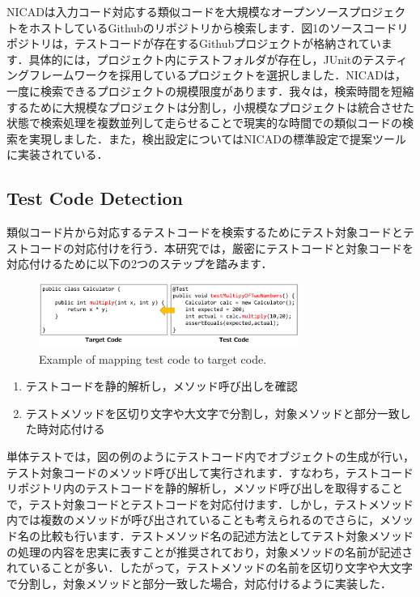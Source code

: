 \documentclass[conference]{IEEEtran}
\begin{document}
NICADは入力コード対応する類似コードを大規模なオープンソースプロジェクトをホストしているGithubのリポジトリから検索します．図1のソースコードリポジトリは，テストコードが存在するGithubプロジェクトが格納されています．具体的には，プロジェクト内にテストフォルダが存在し，JUnitのテスティングフレームワークを採用しているプロジェクトを選択しました．NICADは，一度に検索できるプロジェクトの規模限度があります．我々は，検索時間を短縮するために大規模なプロジェクトは分割し，小規模なプロジェクトは統合させた状態で検索処理を複数並列して走らせることで現実的な時間での類似コードの検索を実現しました．また，検出設定についてはNICADの標準設定で提案ツールに実装されている．

\subsection{Test Code Detection}
類似コード片から対応するテストコードを検索するためにテスト対象コードとテストコードの対応付けを行う．本研究では，厳密にテストコードと対象コードを対応付けるために以下の2つのステップを踏みます．

\begin{figure}[htbp]
\centerline{\includegraphics[width=8.5cm]{mapping.pdf}}
\caption{Example of mapping test code to target code.}
\label{fig}
\end{figure}

\begin{enumerate}
\renewcommand{\labelenumi}{(\arabic{enumi})}
\item テストコードを静的解析し，メソッド呼び出しを確認
\item テストメソッドを区切り文字や大文字で分割し，対象メソッドと部分一致した時対応付ける
\end{enumerate}


単体テストでは，図の例のようにテストコード内でオブジェクトの生成が行い，テスト対象コードのメソッド呼び出して実行されます．すなわち，テストコードリポジトリ内のテストコードを静的解析し，メソッド呼び出しを取得することで，テスト対象コードとテストコードを対応付けます．しかし，テストメソッド内では複数のメソッドが呼び出されていることも考えられるのでさらに，メソッド名の比較も行います．テストメソッド名の記述方法としてテスト対象メソッドの処理の内容を忠実に表すことが推奨されており，対象メソッドの名前が記述されていることが多い．したがって，テストメソッドの名前を区切り文字や大文字で分割し，対象メソッドと部分一致した場合，対応付けるように実装した．
\end{document}
